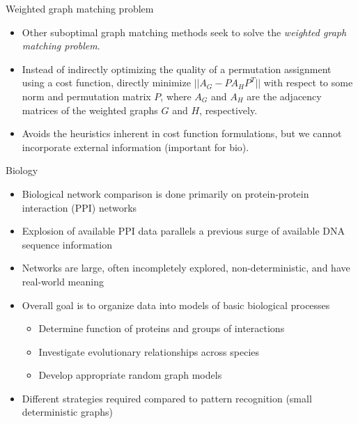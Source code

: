 \documentclass[xcolor=dvipsnames, 14pt]{beamer}
\begin{document}
\begin{frame}{Weighted graph matching problem}
\begin{itemize}
\item Other suboptimal graph matching methods seek to solve the \textit{weighted graph matching problem}.
\pause
\item Instead of indirectly optimizing the quality of a permutation assignment using a cost function, directly minimize $||A_G - PA_HP^T||$ with respect to some norm and permutation matrix $P$, where $A_G$ and $A_H$ are the adjacency matrices of the weighted graphs $G$ and $H$, respectively.
\pause
\item Avoids the heuristics inherent in cost function formulations, but we cannot incorporate external information (important for bio).
\end{itemize}
\end{frame}

\begin{frame}{Biology}
\begin{itemize}
\item Biological network comparison is done primarily on protein-protein interaction (PPI) networks 
\pause
\item Explosion of available PPI data parallels a previous surge of available DNA sequence information
\pause
\item Networks are large, often incompletely explored, non-deterministic, and have real-world meaning
\pause
\item Overall goal is to organize data into models of basic biological processes
\pause
\begin{itemize}
\item Determine function of proteins and groups of interactions
\item Investigate evolutionary relationships across species
\item Develop appropriate random graph models 
\pause
\end{itemize}
\item Different strategies required compared to pattern recognition (small deterministic graphs)
\end{itemize}
\end{frame}
\end{document}
